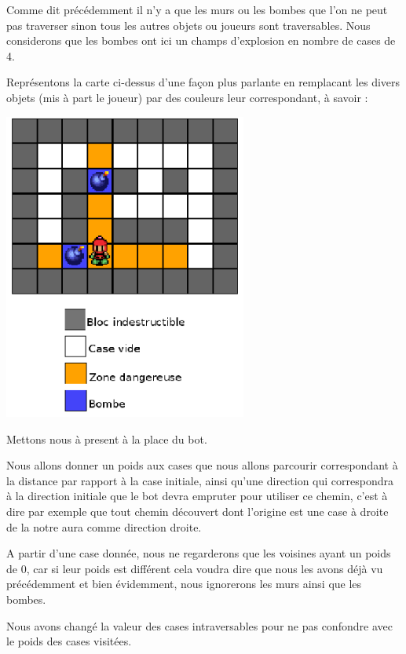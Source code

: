 			Comme dit précédemment il n'y a que les murs ou les bombes que l'on ne peut
			pas traverser sinon tous les autres objets ou joueurs sont traversables.
			Nous considerons que les bombes ont ici un champs d'explosion en nombre de
			cases de 4.			
			
			Représentons la carte ci-dessus d'une façon plus parlante en remplacant les
			divers objets (mis à part le joueur) par des couleurs leur correspondant, à
			savoir :
			
			\begin{center}
				\includegraphics[width=8cm]{./Analyse/Img/largeur_1.eps}
			\end{center}
			
			Mettons nous à present à la place du \gls{bot}.
			
			Nous allons donner un poids aux cases que nous allons parcourir
			correspondant à la distance par rapport à la case initiale, ainsi qu'une
			direction qui correspondra à la direction initiale que le \gls{bot} devra empruter
			pour utiliser ce chemin, c'est à dire par exemple que tout chemin découvert
			dont l'origine est une case à droite de la notre aura comme direction droite.
			
			A partir d'une case donnée, nous ne regarderons que les voisines ayant un poids de 0,
			car si leur poids est différent cela voudra dire que nous les avons déjà vu précédemment et bien évidemment,
			nous ignorerons les murs ainsi que les bombes.
			
			Nous avons changé la valeur des cases intraversables pour ne pas confondre avec le poids des cases visitées.			
			
